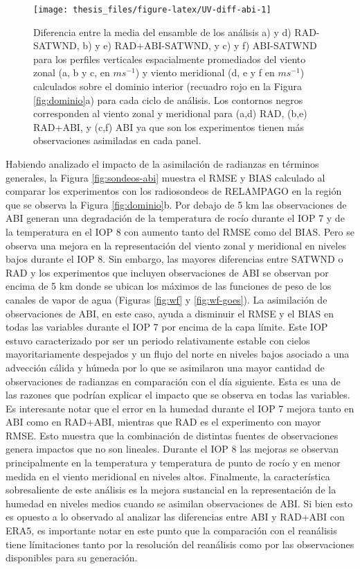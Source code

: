 \documentclass[12pt,oneside,a4paper]{reedthesis}
\begin{document}
\begin{figure}

\texttt{[image: thesis\_files/figure-latex/UV-diff-abi-1]} \hfill{}

\caption{Diferencia entre la media del ensamble de los análisis a) y d) RAD-SATWND, b) y e) RAD+ABI-SATWND, y c) y f) ABI-SATWND para los perfiles verticales espacialmente promediados del viento zonal (a, b y c, en \(ms^{-1}\)) y viento meridional (d, e y f en \(ms^{-1}\)) calculados sobre el dominio interior (recuadro rojo en la Figura \ref{fig:dominio}a) para cada ciclo de análisis. Los contornos negros corresponden al viento zonal y meridional para (a,d) RAD, (b,e) RAD+ABI, y (c,f) ABI ya que son los experimentos tienen más observaciones asimiladas en cada panel.}\label{fig:UV-diff-abi}
\end{figure}
Habiendo analizado el impacto de la asimilación de radianzas en términos generales, la Figura \ref{fig:sondeos-abi} muestra el RMSE y BIAS calculado al comparar los experimentos con los radiosondeos de RELAMPAGO en la región que se observa la Figura \ref{fig:dominio}b. Por debajo de 5 km las observaciones de ABI generan una degradación de la temperatura de rocío durante el IOP 7 y de la temperatura en el IOP 8 con aumento tanto del RMSE como del BIAS. Pero se observa una mejora en la representación del viento zonal y meridional en niveles bajos durante el IOP 8. Sin embargo, las mayores diferencias entre SATWND o RAD y los experimentos que incluyen observaciones de ABI se observan por encima de 5 km donde se ubican los máximos de las funciones de peso de los canales de vapor de agua (Figuras \ref{fig:wf} y \ref{fig:wf-goes}). La asimilación de observaciones de ABI, en este caso, ayuda a disminuir el RMSE y el BIAS en todas las variables durante el IOP 7 por encima de la capa límite. Este IOP estuvo caracterizado por ser un periodo relativamente estable con cielos mayoritariamente despejados y un flujo del norte en niveles bajos asociado a una advección cálida y húmeda por lo que se asimilaron una mayor cantidad de observaciones de radianzas en comparación con el día siguiente. Esta es una de las razones que podrían explicar el impacto que se observa en todas las variables. Es interesante notar que el error en la humedad durante el IOP 7 mejora tanto en ABI como en RAD+ABI, mientras que RAD es el experimento con mayor RMSE. Esto muestra que la combinación de distintas fuentes de observaciones genera impactos que no son lineales. Durante el IOP 8 las mejoras se observan principalmente en la temperatura y temperatura de punto de rocío y en menor medida en el viento meridional en niveles altos. Finalmente, la característica sobresaliente de este análisis es la mejora sustancial en la representación de la humedad en niveles medios cuando se asimilan observaciones de ABI. Si bien esto es opuesto a lo observado al analizar las diferencias entre ABI y RAD+ABI con ERA5, es importante notar en este punto que la comparación con el reanálisis tiene límitaciones tanto por la resolución del reanálisis como por las observaciones disponibles para su generación.
\end{document}
